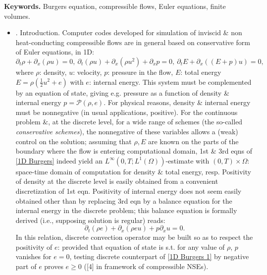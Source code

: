 \documentclass{article}
\begin{document}
\begin{enumerate}
	{\bf Keywords.} Burgers equation, compressible flows, Euler equations, finite volumes.
	\begin{itemize}
		\item {. Introduction.} Computer codes developed for simulation of inviscid \& non heat-conducting compressible flows are in general based on conservative form of Euler equations, in 1D:
		\begin{equation}
			\label{1D Burgers}
			\partial_t\rho + \partial_x(\rho u) = 0,\ \partial_t(\rho u) + \partial_x(\rho u^2) + \partial_xp = 0,\ \partial_tE + \partial_x((E + p)u) = 0,
		\end{equation}
		where $\rho$: density, $u$: velocity, $p$: pressure in the flow, $E$: total energy $E = \rho\left(\frac{1}{2}u^2 + e\right)$ with $e$: internal energy. This system must be complemented by an equation of state, giving e.g. pressure as a function of density \& internal energy $p = \mathcal{P}(\rho,e)$. For physical reasons, density \& internal energy must be nonnegative (in usual applications, positive). For the continuous problem \&, at the discrete level, for a wide range of schemes (the so-called {\it conservative schemes}), the nonnegative of these variables allows a (weak) control on the solution; assuming that $\rho,E$ are known on the parts of the boundary where the flow is entering computational domain, 1st \& 3rd eqns of \eqref{1D Burgers} indeed yield an $L^\infty(0,T;L^1(\Omega))$-estimate with $(0,T)\times\Omega$: space-time domain of computation for density \& total energy, resp. Positivity of density at the discrete level is easily obtained from a convenient discretization of 1st eqn. Positivity of internal energy does not seem easily obtained other than by replacing 3rd eqn by a balance equation for the internal energy in the discrete problem; this balance equation is formally derived (i.e., supposing solution is regular) reads:
		\begin{equation}
			\label{1D Burgers 1}
			\partial_t(\rho e) + \partial_x(\rho eu) + p\partial_xu = 0.
		\end{equation}
		In this relation, discrete convection operator may be built so as to respect the positivity of $e$: provided that equation of state is s.t. for any value of $\rho$, $p$ vanishes for $e = 0$, testing discrete counterpart of \eqref{1D Burgers 1} by negative part of $e$ proves $e\ge0$ ([4] in framework of compressible NSEs).
		

\end{itemize}
\end{enumerate}
\end{document}
